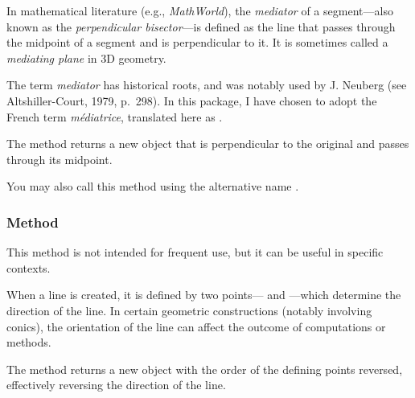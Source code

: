 In mathematical literature (e.g., \textit{MathWorld}), the \emph{mediator} of a segment—also known as the \emph{perpendicular bisector}—is defined as the line that passes through the midpoint of a segment and is perpendicular to it. It is sometimes called a \emph{mediating plane} in 3D geometry.

The term \emph{mediator} has historical roots, and was notably used by J. Neuberg (see Altshiller-Court, 1979, p.~298). In this package, I have chosen to adopt the French term \emph{médiatrice}, translated here as .

\medskip
\noindent
The method returns a new  object that is perpendicular to the original and passes through its midpoint.

\medskip
\noindent
{} You may also call this method using the alternative name .

\vspace{1em}
\begin{tkzexample}[latex=.5\textwidth]
\begin{center}
\end{center}
\end{tkzexample}


\subsubsection{Method } %
\label{ssub:method_line_swap__line}

This method is not intended for frequent use, but it can be useful in specific contexts.

\medskip
\noindent
When a line is created, it is defined by two points— and —which determine the direction of the line. In certain geometric constructions (notably involving conics), the orientation of the line can affect the outcome of computations or methods.

\medskip
\noindent
The  method returns a new  object with the order of the defining points reversed, effectively reversing the direction of the line.

